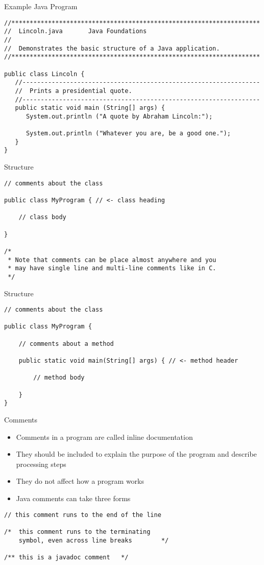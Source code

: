 \documentclass{beamer}
\begin{document}
\begin{frame}[fragile]{Example Java Program}
\begin{lstlisting}
//********************************************************************
//  Lincoln.java       Java Foundations
//
//  Demonstrates the basic structure of a Java application.
//********************************************************************

public class Lincoln {
   //-----------------------------------------------------------------
   //  Prints a presidential quote.
   //-----------------------------------------------------------------
   public static void main (String[] args) {
      System.out.println ("A quote by Abraham Lincoln:");

      System.out.println ("Whatever you are, be a good one.");
   }
}
\end{lstlisting}
\end{frame}

\begin{frame}[fragile]{Structure}
\begin{lstlisting}
// comments about the class

public class MyProgram { // <- class heading

    // class body

}

/* 
 * Note that comments can be place almost anywhere and you
 * may have single line and multi-line comments like in C.
 */
\end{lstlisting}
\end{frame}

\begin{frame}[fragile]{Structure}
\begin{lstlisting}
// comments about the class

public class MyProgram {

    // comments about a method

    public static void main(String[] args) { // <- method header

        // method body

    }
}
\end{lstlisting}
\end{frame}

\begin{frame}[fragile]{Comments}
\begin{itemize}
\item Comments in a program are called inline documentation
\item They should be included to explain the purpose of the program and describe processing steps
\item They do not affect how a program works
\item Java comments can take three forms
\end{itemize}
\begin{lstlisting}
// this comment runs to the end of the line

/*  this comment runs to the terminating
    symbol, even across line breaks        */

/** this is a javadoc comment   */
\end{lstlisting}
\end{frame}
\end{document}
